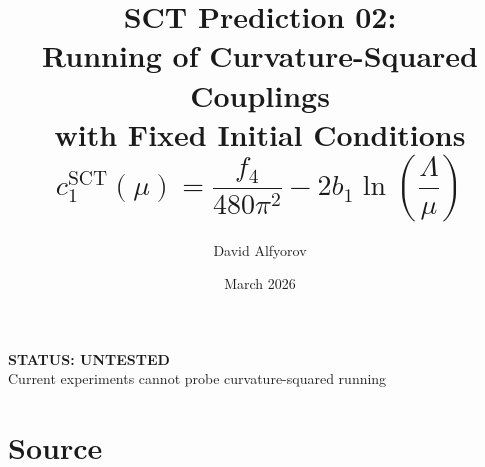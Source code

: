 \documentclass[11pt,a4paper]{article}
\title{%
  \textbf{SCT Prediction 02:}\\[6pt]
  \Large Running of Curvature-Squared Couplings\\
  with Fixed Initial Conditions\\[4pt]
  \large $c_1^{\text{SCT}}(\mu) = \dfrac{f_4}{480\pi^2} - 2b_1\ln\!\left(\dfrac{\Lambda}{\mu}\right)$
}
\author{David Alfyorov}
\date{March 2026}
\begin{document}
\maketitle


\begin{center}
\end{center}

\begin{center}
  \colorbox{untested!15}{\parbox{0.6\textwidth}{\centering
    \textbf{\color{untested} STATUS: UNTESTED}\\[2pt]
    \small Current experiments cannot probe curvature-squared running
  }}
\end{center}

\vspace{1em}

\section{Source}
\end{document}
